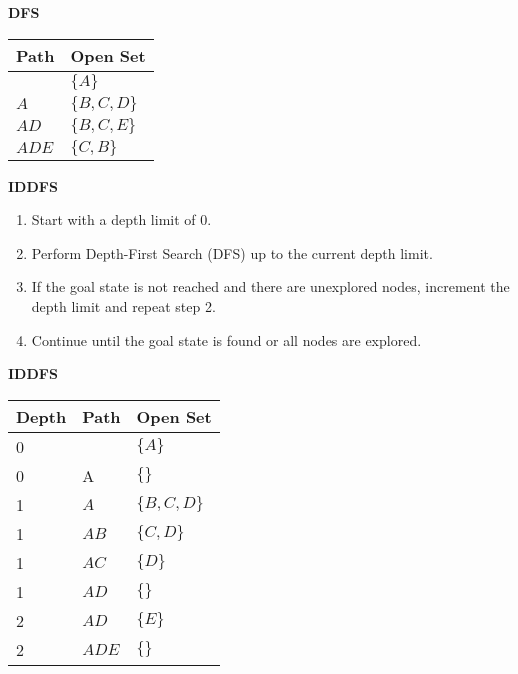 \begin{example} \textbf{DFS}
    \begin{center}
        \begin{tabular}{ll}
        \toprule
        \textbf{Path} & \textbf{Open Set} \\
        \midrule
         & $\{A\}$ \\
        $A$ & $\{B,C,D\}$ \\
        $AD$ & $\{B,C,E\}$ \\
        $ADE$ & $\{C, B\}$ \\
        \bottomrule
        \end{tabular}
    \end{center}
\end{example}


\begin{process} \textbf{IDDFS}
    \begin{enumerate}
        \item Start with a depth limit of 0.
        \item Perform Depth-First Search (DFS) up to the current depth limit.
        \item If the goal state is not reached and there are unexplored nodes, increment the depth limit and repeat step 2.
        \item Continue until the goal state is found or all nodes are explored.
    \end{enumerate}
\end{process}

\begin{example} \textbf{IDDFS}
    \begin{center}
        \begin{tabular}{lll}
        \toprule
        \textbf{Depth} & \textbf{Path} & \textbf{Open Set} \\
        \midrule
        0 & & $\{A\}$ \\
        0 & A & $\{\}$ \\
        \midrule
        1 & $A$ & $\{B, C, D\}$ \\
        1 & $AB$ & $\{C, D\}$ \\
        1 & $AC$ & $\{D\}$ \\
        1 & $AD$ & $\{\}$ \\
        \midrule
        2 & $AD$ & $\{E\}$ \\
        2 & $ADE$ & $\{\}$ \\
        \bottomrule
        \end{tabular}
    \end{center}
\end{example}

